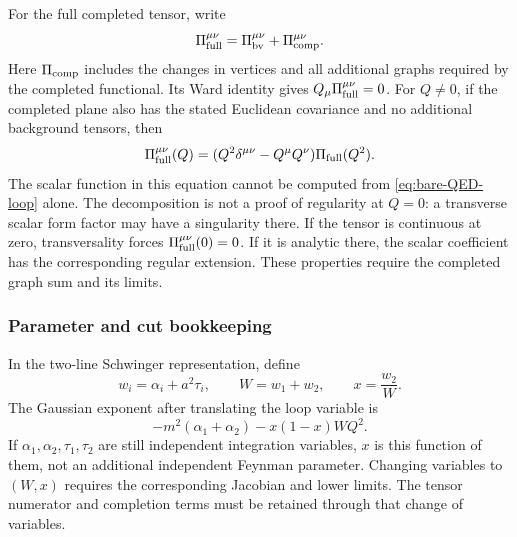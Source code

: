 \documentclass[final,5p,times,twocolumn,numbers,nopreprintline]{elsarticle}
\numberwithin{equation}{section}
\theoremstyle{definition}
\theoremstyle{remark}
\begin{document}
For the full completed tensor, write
\begin{equation}
 \Pi_{\rm full}^{\mu\nu}
      =\Pi_{\rm bv}^{\mu\nu}+\Pi_{\rm comp}^{\mu\nu}.
 \label{eq:Pi-complete}
\end{equation}
Here \(\Pi_{\rm comp}\) includes the changes in vertices and all
additional graphs required by the completed functional.
Its Ward identity gives
\(Q_\mu\Pi_{\rm full}^{\mu\nu}=0\).
For \(Q\ne0\), if the completed plane also has the stated
Euclidean covariance and no additional background tensors, then
\begin{equation}
 \Pi_{\rm full}^{\mu\nu}(Q)
    =(Q^2\delta^{\mu\nu}-Q^\mu Q^\nu)
                       \Pi_{\rm full}(Q^2).
 \label{eq:Pi-transverse}
\end{equation}
The scalar function in this equation cannot be computed from
\eqref{eq:bare-QED-loop} alone. The decomposition is not a proof of
regularity at \(Q=0\): a transverse scalar form factor may have a
singularity there. If the tensor is continuous at zero, transversality
forces \(\Pi_{\rm full}^{\mu\nu}(0)=0\). If it is analytic
there, the scalar coefficient has the corresponding regular extension.
These properties require the completed graph sum and its limits.

\subsubsection*{Parameter and cut bookkeeping}

In the two-line Schwinger representation, define
\[
 w_i=\alpha_i+a^2\tau_i,\qquad
 W=w_1+w_2,\qquad x=\frac{w_2}{W}.
\]
The Gaussian exponent after translating the loop variable is
\[
 -m^2(\alpha_1+\alpha_2)-x(1-x)WQ^2.
\]
If \(\alpha_1,\alpha_2,\tau_1,\tau_2\) are still independent
integration variables, \(x\) is this function of them, not an
additional independent Feynman parameter. Changing variables to
\((W,x)\) requires the corresponding Jacobian and lower limits.
The tensor numerator and completion terms must be retained through
that change of variables.
\end{document}
